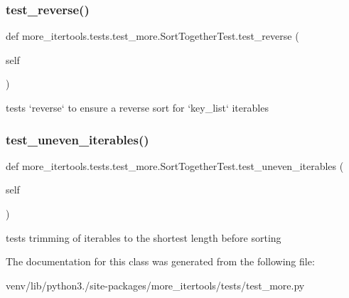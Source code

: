 \subsubsection{\texorpdfstring{test\+\_\+reverse()}{test\_reverse()}}
{\footnotesize\ttfamily def more\+\_\+itertools.\+tests.\+test\+\_\+more.\+Sort\+Together\+Test.\+test\+\_\+reverse (\begin{DoxyParamCaption}\item[{}]{self }\end{DoxyParamCaption})}

\begin{DoxyVerb}tests `reverse` to ensure a reverse sort for `key_list` iterables\end{DoxyVerb}
 \mbox{\label{classmore__itertools_1_1tests_1_1test__more_1_1_sort_together_test_ad3bd77fc9749e6359d3d5d5f706e43ac}} 
\subsubsection{\texorpdfstring{test\+\_\+uneven\+\_\+iterables()}{test\_uneven\_iterables()}}
{\footnotesize\ttfamily def more\+\_\+itertools.\+tests.\+test\+\_\+more.\+Sort\+Together\+Test.\+test\+\_\+uneven\+\_\+iterables (\begin{DoxyParamCaption}\item[{}]{self }\end{DoxyParamCaption})}

\begin{DoxyVerb}tests trimming of iterables to the shortest length before sorting\end{DoxyVerb}
 

The documentation for this class was generated from the following file\+:\begin{DoxyCompactItemize}
\item 
venv/lib/python3./site-\/packages/more\+\_\+itertools/tests/test\+\_\+more.\+py\end{DoxyCompactItemize}

